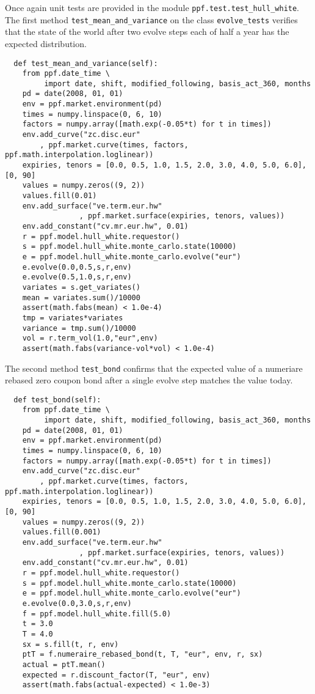 Once again unit tests are provided in the module
\verb|ppf.test.test_hull_white|. The first method
\verb|test_mean_and_variance| on the class \verb|evolve_tests|
verifies that the state of the world after two evolve steps each of
half a year has the expected distribution.
\begin{verbatim}
  def test_mean_and_variance(self):
    from ppf.date_time \
         import date, shift, modified_following, basis_act_360, months
    pd = date(2008, 01, 01)
    env = ppf.market.environment(pd)
    times = numpy.linspace(0, 6, 10)
    factors = numpy.array([math.exp(-0.05*t) for t in times])
    env.add_curve("zc.disc.eur"
        , ppf.market.curve(times, factors, ppf.math.interpolation.loglinear))
    expiries, tenors = [0.0, 0.5, 1.0, 1.5, 2.0, 3.0, 4.0, 5.0, 6.0], [0, 90]
    values = numpy.zeros((9, 2))
    values.fill(0.01)
    env.add_surface("ve.term.eur.hw"
                 , ppf.market.surface(expiries, tenors, values))
    env.add_constant("cv.mr.eur.hw", 0.01)
    r = ppf.model.hull_white.requestor()
    s = ppf.model.hull_white.monte_carlo.state(10000)
    e = ppf.model.hull_white.monte_carlo.evolve("eur")
    e.evolve(0.0,0.5,s,r,env)
    e.evolve(0.5,1.0,s,r,env)
    variates = s.get_variates()
    mean = variates.sum()/10000
    assert(math.fabs(mean) < 1.0e-4)
    tmp = variates*variates
    variance = tmp.sum()/10000
    vol = r.term_vol(1.0,"eur",env)
    assert(math.fabs(variance-vol*vol) < 1.0e-4)
\end{verbatim}
The second method \verb|test_bond| confirms that the expected value of
a numeriare rebased zero coupon bond after a single evolve step
matches the value today.
\begin{verbatim}
  def test_bond(self):
    from ppf.date_time \
         import date, shift, modified_following, basis_act_360, months
    pd = date(2008, 01, 01)
    env = ppf.market.environment(pd)
    times = numpy.linspace(0, 6, 10)
    factors = numpy.array([math.exp(-0.05*t) for t in times])
    env.add_curve("zc.disc.eur"
        , ppf.market.curve(times, factors, ppf.math.interpolation.loglinear))
    expiries, tenors = [0.0, 0.5, 1.0, 1.5, 2.0, 3.0, 4.0, 5.0, 6.0], [0, 90]
    values = numpy.zeros((9, 2))
    values.fill(0.001)
    env.add_surface("ve.term.eur.hw"
                 , ppf.market.surface(expiries, tenors, values))
    env.add_constant("cv.mr.eur.hw", 0.01)
    r = ppf.model.hull_white.requestor()
    s = ppf.model.hull_white.monte_carlo.state(10000)
    e = ppf.model.hull_white.monte_carlo.evolve("eur")
    e.evolve(0.0,3.0,s,r,env)
    f = ppf.model.hull_white.fill(5.0)
    t = 3.0
    T = 4.0
    sx = s.fill(t, r, env)
    ptT = f.numeraire_rebased_bond(t, T, "eur", env, r, sx)
    actual = ptT.mean()
    expected = r.discount_factor(T, "eur", env)
    assert(math.fabs(actual-expected) < 1.0e-3)
\end{verbatim} 

